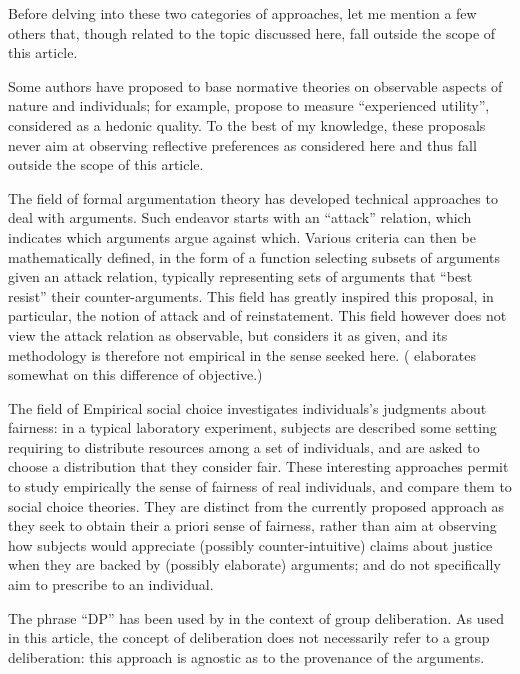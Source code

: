 \documentclass[version=last, pagesize, twoside=off, bibliography=totoc, DIV=calc, fontsize=12pt, a4paper, french, english]{scrartcl}
\begin{document}
Before delving into these two categories of approaches, let me mention a few others that, though related to the topic discussed here, fall outside the scope of this article.

Some authors have proposed to base normative theories on observable aspects of nature and individuals; for example, \citet{kahneman_back_1997} propose to measure “experienced utility”, considered as a hedonic quality. 
To the best of my knowledge, these proposals never aim at observing reflective preferences as considered here and thus fall outside the scope of this article.

The field of formal argumentation theory has developed technical approaches to deal with arguments. Such endeavor starts with an “attack” relation, which indicates which arguments argue against which. Various criteria can then be mathematically defined, in the form of a function selecting subsets of arguments given an attack relation, typically representing sets of arguments that “best resist” their counter-arguments. This field has greatly inspired this proposal, in particular, the notion of attack and of reinstatement. This field however does not view the attack relation as observable, but considers it as given, and its methodology is therefore not empirical in the sense seeked here. ( elaborates somewhat on this difference of objective.) 

The field of Empirical social choice \citep{gaertner_empirical_2012} investigates individuals’s judgments about fairness: in a typical laboratory experiment, subjects are described some setting requiring to distribute resources among a set of individuals, and are asked to choose a distribution that they consider fair. These interesting approaches permit to study empirically the sense of fairness of real individuals, and compare them to social choice theories. They are distinct from the currently proposed approach as they seek to obtain their a priori sense of fairness, rather than aim at observing how subjects would appreciate (possibly counter-intuitive) claims about justice when they are backed by (possibly elaborate) arguments; and do not specifically aim to prescribe to an individual.

The phrase “\acl{DP}” has been used by \citet{orchard-webb_deliberative_2016, kenter_deliberative_2017} in the context of group deliberation. As used in this article, the concept of deliberation does not necessarily refer to a group deliberation: this approach is agnostic as to the provenance of the arguments.
\end{document}
